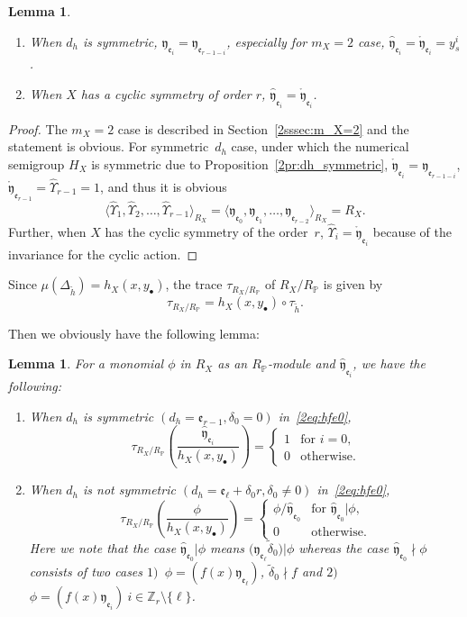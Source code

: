 \documentclass[10pt,a4paper]{amsart}
\def\ZZ{{\mathbb Z}}
\def\PP{{\mathbb P}}
\def\fe{{\mathfrak e}}
\def\fy{{\mathfrak y}}
\def\th{{\widetilde h}}
\def\tdelta{{\widetilde \delta}}
\def\hfy{{\widehat{\mathfrak y}}}
\def\hUpsilon{{\widehat \Upsilon}}
\def\rfy{{\mathring{\mathfrak y}}}
\numberwithin{equation}{section}
\newtheorem{Lemma}[Theorem]{Lemma}
\begin{document}
\begin{Lemma}\label{2lm:Emp_hfy_e}\quad
\begin{enumerate}\itemsep=0pt
\item[$1.$] When $d_h$ is symmetric, $\hfy_{\fe_i}=\fy_{\fe_{r-1-i}}$, especially for $m_X=2$ case, $\hfy_{\fe_i}=\rfy_{\fe_i}=y_s^i$.

\item[$2.$] When $X$ has a cyclic symmetry of order $r$, $\hfy_{\fe_i}=\rfy_{\fe_i}$.
\end{enumerate}
\end{Lemma}

\begin{proof}The $m_X=2$ case is described in Section~\ref{2sssec:m_X=2} and the statement is obvious.
For symmetric~$d_h$ case, under which the numerical semigroup $H_X$ is symmetric due to Proposition~\ref{2pr:dh_symmetric}, $\rfy_{\fe_i}=\fy_{\fe_{r-1-i}}$, $\rfy_{\fe_{r-1}}=\hUpsilon_{r-1}=1$, and thus it is obvious
\[
\big\langle \hUpsilon_{1}, \hUpsilon_{2}, \dots, \hUpsilon_{r-1}\big\rangle_{R_X}
=\langle \fy_{\fe_0}, \fy_{\fe_1}, \dots, \fy_{\fe_{r-2}}\rangle_{R_X}=R_X.
\]
Further, when $X$ has the cyclic symmetry of the order~$r$, $\hUpsilon_{i}= \rfy_{\fe_i}$ because of the invariance for the cyclic action.
\end{proof}

Since $\mu(\Delta_{\th})=h_X(x, y_\bullet)$, the trace $\tau_{R_X/R_\PP}$ of $R_X/R_\PP$ is given by
\[
\tau_{R_X/R_\PP}= h_X(x, y_\bullet)\circ \tau_\th.
\]

Then we obviously have the following lemma:
\begin{Lemma}\label{2lm:tau_RXRP_phi}
For a monomial $\phi$ in $R_X$ as an $R_\PP$-module and $\hfy_{\fe_i}$, we have the following:
\begin{enumerate}\itemsep=0pt

\item[$1.$] When $d_h$ is symmetric $(d_h= \fe_{r-1}, \delta_0=0)$ in~\eqref{2eq:hfe0},
\[
\tau_{R_X/R_\PP}
\left(\frac{\hfy_{\fe_i}}{h_X(x, y_\bullet)}\right)
=
\begin{cases}
1 & \text{for } i=0,\\
0 & \text{otherwise}.
\end{cases}
\]

\item[$2.$] When $d_h$ is not symmetric $(d_h= \fe_\ell + \delta_0 r, \delta_0\neq0)$ in~\eqref{2eq:hfe0},
\[
\tau_{R_X/R_\PP}
\left(\frac{\phi}{h_X(x, y_\bullet)}\right)
=
\begin{cases}
\phi/\hfy_{\fe_0}
& \text{for } \hfy_{\fe_0}|\phi, \\
0 & \text{otherwise}.
\end{cases}
\]
Here we note that the case $\hfy_{\fe_0}|\phi$ means $\big(\fy_{\fe_\ell}\tdelta_0\big)|\phi$ whereas the case $\hfy_{\fe_0}\nmid \phi$ consists of two cases $1)$~$\phi = (f(x) \fy_{\fe_\ell})$, $\tdelta_0\nmid f$ and $2)$ $\phi = (f(x) \fy_{\fe_i})\ i \in \ZZ_r\setminus \{\ell\}$.
\end{enumerate}
\end{Lemma}
\end{document}
